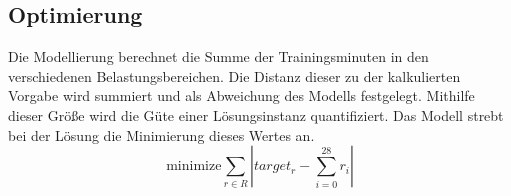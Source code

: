 \subsection{Optimierung}
Die Modellierung berechnet die Summe der Trainingsminuten in den verschiedenen Belastungsbereichen. Die Distanz dieser zu der kalkulierten Vorgabe wird summiert und als Abweichung des Modells festgelegt. Mithilfe dieser Größe wird die Güte einer Lösungsinstanz quantifiziert. Das Modell strebt bei der Lösung die Minimierung dieses Wertes an.
\begin{equation}
    \text{minimize} \sum_{r\in R} |target_r - \sum_{i=0}^{28}r_i|
\end{equation} 
